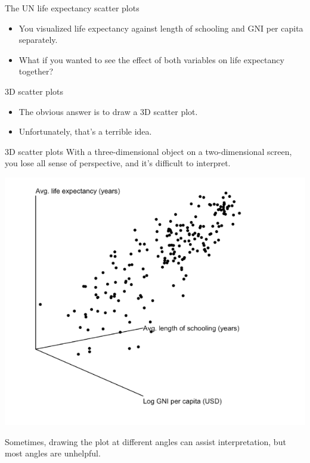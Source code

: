 \documentclass[
  ignorenonframetext,
]{beamer}
\begin{document}
\begin{frame}{The UN life expectancy scatter plots}
\label{the-un-life-expectancy-scatter-plots-1}
\begin{itemize}
\item
  You visualized life expectancy against length of schooling and GNI per
  capita separately.
\item
  What if you wanted to see the effect of both variables on life
  expectancy together?
\end{itemize}
\end{frame}

\begin{frame}{3D scatter plots}
\label{d-scatter-plots}
\begin{itemize}
\item
  The obvious answer is to draw a 3D scatter plot.
\item
  Unfortunately, that's a terrible idea.
\end{itemize}
\end{frame}

\begin{frame}{3D scatter plots}
\label{d-scatter-plots-1}
With a three-dimensional object on a two-dimensional screen, you lose
all sense of perspective, and it's difficult to interpret.

\includegraphics{../images/im65.png}

Sometimes, drawing the plot at different angles can assist
interpretation, but most angles are unhelpful.
\end{frame}
\end{document}
